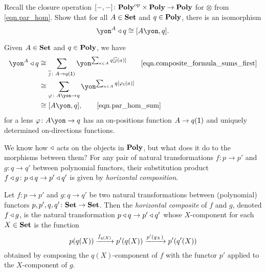 \documentclass[Book-Poly]{subfiles}
\begin{document}
\begin{exercise}
Recall the closure operation $[-,-]\colon\mathbf{Poly}^{\textnormal{op}}\times\mathbf{Poly}\to\mathbf{Poly}$ for $\otimes$ from \eqref{eqn.par_hom}.
Show that for all $A\in\mathbf{Set}$ and $q\in\mathbf{Poly}$, there is an isomorphism
\[
    \yon^A\tri q\iso\ihom{A\yon,q}.
\]
\begin{solution}
Given $A\in\mathbf{Set}$ and $q\in\mathbf{Poly}$, we have
\begin{align*}
    \yon^A\tri q    &\iso
	\sum_{\ol{j}\colon A\to q(\1)}\yon^{\sum_{a\in A}q[\ol{j}(a)]}
	\tag*{\eqref{eqn.composite_formula_sums_first}} \\ &\iso
	\sum_{\varphi\colon A\yon\to q}\yon^{\sum_{a\in A}q[\varphi_\1(a)]}   \\&\iso
	\ihom{A\yon,q},
	\tag*{\eqref{eqn.par_hom_sum}}
\end{align*}
for a lens $\varphi\colon A\yon\to q$ has an on-positions function $A\to q(\textsf{1})$ and uniquely determined on-directions functions.
\end{solution}
\end{exercise}

We know how $\mathbin{\triangleleft}$ acts on the objects in $\mathbf{Poly}$, but what does it do to the morphisms between them?
For any pair of natural transformations $f\colon p\to p'$ and $g\colon q\to q'$ between polynomial functors, their substitution product $f\mathbin{\triangleleft} g\colon p\mathbin{\triangleleft} q\to p'\mathbin{\triangleleft} q'$ is given by \emph{horizontal composition}.


\begin{definition}\label{def.horiz_comp_nat_trans}
Let $f\colon p\to p'$ and $g\colon q\to q'$ be two natural transformations between (polynomial) functors $p,p',q,q'\colon\mathbf{Set}\to\mathbf{Set}$.
Then the \emph{horizontal composite} of $f$ and $g$, denoted $f\mathbin{\triangleleft} g$, is the natural transformation $p\mathbin{\triangleleft} q\to p'\mathbin{\triangleleft} q'$ whose $X$-component for each $X\in\mathbf{Set}$ is the function
\begin{equation} \label{eqn.horiz_comp_nat_trans_comp}
    p(q(X)) \xrightarrow{f_{q(X)}} p'(q(X)) \xrightarrow{p'(g_X)} p'(q'(X))
\end{equation}
obtained by composing the $q(X)$-component of $f$ with the functor $p'$ applied to the $X$-component of $g$.
\end{definition}
\end{document}
